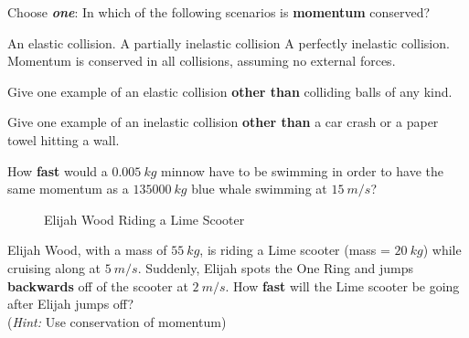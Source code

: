 \begin{questions}
\question[1] Choose \textbf{\emph{one}}: In which of the following scenarios is \textbf{momentum} conserved?
\begin{choices}
\choice An elastic collision.
\choice A partially inelastic collision
\choice A perfectly inelastic collision. 
\choice Momentum is conserved in all collisions, assuming no external forces.
\end{choices}

\question[2] Give one example of an elastic collision \textbf{other than} colliding balls of any kind. 

\qspp

\question[2] Give one example of an inelastic collision \textbf{other than} a car crash or a paper towel hitting a wall. 

\qspp

\question[2] How \textbf{fast} would a $\SI{0.005}{kg}$ minnow have to be swimming in order to have the same momentum as a $\SI{135000}{kg}$ blue whale swimming at $\SI{15}{m/s}$? 

\qsppp

\begin{figure}[H]
    \centering
    \caption{Elijah Wood Riding a Lime Scooter}
\end{figure}

\question[3] Elijah Wood, with a mass of $\SI{55}{kg}$, is riding a Lime scooter (mass = $\SI{20}{kg}$) while cruising along at $\SI{5}{m/s}$. Suddenly, Elijah spots the One Ring and jumps \textbf{backwards} off of the scooter at $\SI{2}{m/s}$. How \textbf{fast} will the Lime scooter be going after Elijah jumps off? \\(\emph{Hint:} Use conservation of momentum)


\end{questions}



